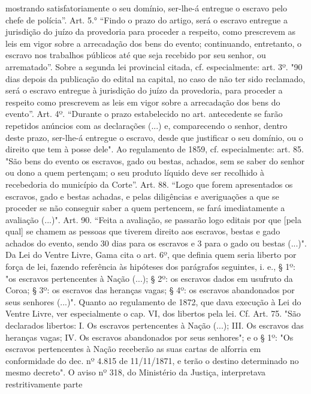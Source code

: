 {  mostrando satisfatoriamente o seu domínio, ser-lhe-á entregue o
  escravo pelo chefe de polícia''. Art. 5.° ``Findo o prazo do artigo,
  será o escravo entregue a jurisdição do juízo da provedoria para
  proceder a respeito, como prescrevem as leis em vigor sobre a
  arrecadação dos bens do evento; continuando, entretanto, o escravo nos
  trabalhos públicos até que seja recebido por seu senhor, ou
  arrematado''. Sobre a segunda lei provincial citada, cf.
  especialmente: art. 3º. "90 dias depois da publicação do edital na
  capital, no caso de não ter sido reclamado, será o escravo entregue à
  jurisdição do juízo da provedoria, para proceder a respeito como
  prescrevem as leis em vigor sobre a arrecadação dos bens do evento''.
  Art. 4º. ``Durante o prazo estabelecido no art. antecedente se farão
  repetidos anúncios com as declarações (...) e, comparecendo o senhor,
  dentro deste prazo, ser-lhe-á entregue o escravo, desde que justificar
  o seu domínio, ou o direito que tem à posse dele". Ao regulamento de
  1859, cf. especialmente: art. 85. "São bens do evento os escravos,
  gado ou bestas, achados, sem se saber do senhor ou dono a quem
  pertençam; o seu produto líquido deve ser recolhido à recebedoria do
  município da Corte''. Art. 88. ``Logo que forem apresentados os
  escravos, gado e bestas achadas, e pelas diligências e averiguações a
  que se proceder se não conseguir saber a quem pertencem, se fará
  imediatamente a avaliação (...)". Art. 90. ``Feita a avaliação, se
  passarão logo editais por que {[}pela qual{]} se chamem as pessoas que
  tiverem direito aos escravos, bestas e gado achados do evento, sendo
  30 dias para os escravos e 3 para o gado ou bestas (...)". Da Lei do
  Ventre Livre, Gama cita o art. 6º, que definia quem seria liberto por
  força de lei, fazendo referência às hipóteses dos parágrafos
  seguintes, i. e., § 1º: "os escravos pertencentes à Nação (...); § 2º:
  os escravos dados em usufruto da Coroa; § 3º: os escravos das heranças
  vagas; § 4º: os escravos abandonados por seus senhores (...)". Quanto
  ao regulamento de 1872, que dava execução à Lei do Ventre Livre, ver
  especialmente o cap. VI, dos libertos pela lei. Cf. Art. 75. "São
  declarados libertos: I. Os escravos pertencentes à Nação (...); III.
  Os escravos das heranças vagas; IV. Os escravos abandonados por seus
  senhores"; e o § 1º: "Os escravos pertencentes à Nação receberão as
  suas cartas de alforria em conformidade do dec. nº 4.815 de
  11/11/1871, e terão o destino determinado no mesmo decreto". O aviso
  nº 318, do Ministério da Justiça, interpretava restritivamente parte
}
